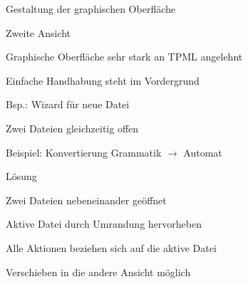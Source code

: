 



{
    \begin{itemgroup}{}
	\item Gestaltung der graphischen Oberfläche
	\item Zweite Ansicht
	\end{itemgroup}
  
	\vfill{}
}


{
    \begin{itemgroup}{}
	\item Graphische Oberfläche sehr stark an TPML angelehnt
	\item Einfache Handhabung steht im Vordergrund
		\begin{itemgroup}{}
		\item Bsp.: Wizard für neue Datei
		\end{itemgroup}	
	\end{itemgroup}
  
	\vfill{}
}


{
    \begin{itemgroup}{}
	\item Zwei Dateien gleichzeitig offen
	\item Beispiel: Konvertierung Grammatik $\to$ Automat
    \end{itemgroup}

    \begin{itemgroup}{Lösung}
	\item Zwei Dateien nebeneinander geöffnet
	\item Aktive Datei durch Umrandung hervorheben
	\item Alle Aktionen beziehen sich auf die aktive Datei
	\item Verschieben in die andere Ansicht möglich
	\end{itemgroup}
    
    \vfill{}
}



